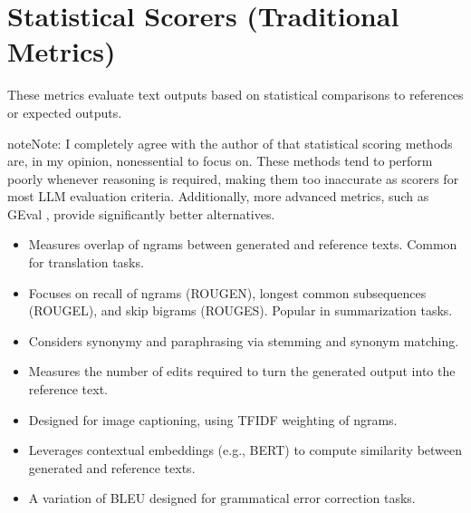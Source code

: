 \documentclass[letterpaper,11pt,english]{sphinxmanual}
\begin{document}
\section{Statistical Scorers (Traditional Metrics)}
\label{\detokenize{evaluation:statistical-scorers-traditional-metrics}}
\sphinxAtStartPar
These metrics evaluate text outputs based on statistical comparisons to references
or expected outputs.

\begin{sphinxadmonition}{note}{Note:}
\sphinxAtStartPar
I completely agree with the author of 
that statistical scoring methods are,
in my opinion, non\sphinxhyphen{}essential to focus on. These methods tend to perform poorly
whenever reasoning is required, making them too inaccurate as scorers for
most LLM evaluation criteria. Additionally, more advanced metrics,
such as GEval {\hyperref[\detokenize{evaluation:geval}]{}}, provide significantly better alternatives.
\end{sphinxadmonition}
\begin{itemize}
\item {} 
\sphinxAtStartPar
{}
Measures overlap of n\sphinxhyphen{}grams between generated and reference texts.
Common for translation tasks.

\item {} 
\sphinxAtStartPar
{}
Focuses on recall of n\sphinxhyphen{}grams (ROUGE\sphinxhyphen{}N), longest common subsequences (ROUGE\sphinxhyphen{}L),
and skip bigrams (ROUGE\sphinxhyphen{}S). Popular in summarization tasks.

\item {} 
\sphinxAtStartPar
{}
Considers synonymy and paraphrasing via stemming and synonym matching.

\item {} 
\sphinxAtStartPar
{}
Measures the number of edits required to turn the generated output into the
reference text.

\item {} 
\sphinxAtStartPar
{}
Designed for image captioning, using TF\sphinxhyphen{}IDF weighting of n\sphinxhyphen{}grams.

\item {} 
\sphinxAtStartPar
{}
Leverages contextual embeddings (e.g., BERT) to compute similarity between
generated and reference texts.

\item {} 
\sphinxAtStartPar
{}
A variation of BLEU designed for grammatical error correction tasks.

\end{itemize}
\end{document}
